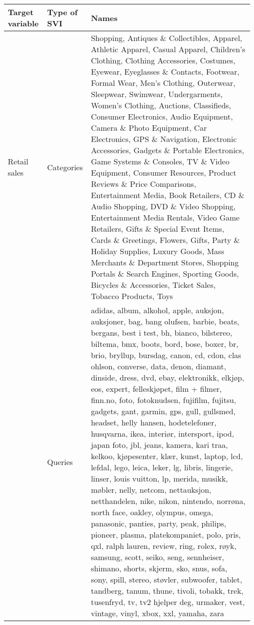 \begin{table}[H]
	\center
	\scriptsize
	\begin{tabularx}{\textwidth}{@{}llX@{}}
		\toprule
 		\textbf{Target variable} & \textbf{Type of SVI} & \textbf{Names} \\ 
  		\midrule
		Retail sales & Categories & Shopping, Antiques \& Collectibles, Apparel, Athletic Apparel, Casual Apparel, Children's Clothing, Clothing Accessories, Costumes, Eyewear, Eyeglasses \& Contacts, Footwear, Formal Wear, Men's Clothing, Outerwear, Sleepwear, Swimwear, Undergarments, Women's Clothing, Auctions, Classifieds, Consumer Electronics, Audio Equipment, Camera \& Photo Equipment, Car Electronics, GPS \& Navigation, Electronic Accessories, Gadgets \& Portable Electronics, Game Systems \& Consoles, TV \& Video Equipment, Consumer Resources, Product Reviews \& Price Comparisons, Entertainment Media, Book Retailers, CD \& Audio Shopping, DVD \& Video Shopping, Entertainment Media Rentals, Video Game Retailers, Gifts \& Special Event Items, Cards \& Greetings, Flowers, Gifts, Party \& Holiday Supplies, Luxury Goods, Mass Merchants \& Department Stores, Shopping Portals \& Search Engines, Sporting Goods, Bicycles \& Accessories, Ticket Sales, Tobacco Products, Toys \\
  		& Queries & adidas, album, alkohol, apple, auksjon, auksjoner, bag, bang olufsen, barbie, beats, bergans, best i test, bh, bianco, bilstereo, biltema, bmx, boots, bord, bose, boxer, br, brio, bryllup, bursdag, canon, cd, cdon, clas ohlson, converse, data, denon, diamant, dinside, dress, dvd, ebay, elektronikk, elkjøp, eos, expert, felleskjøpet, film + filmer, finn.no, foto, fotoknudsen, fujifilm, fujitsu, gadgets, gant, garmin, gps, gull, gullsmed, headset, helly hansen, hodetelefoner, husqvarna, ikea, interiør, intersport, ipod, japan foto, jbl, jeans, kamera, kari traa, kelkoo, kjøpesenter, klær, kunst, laptop, lcd, lefdal, lego, leica, leker, lg, libris, lingerie, linser, louis vuitton, lp, merida, musikk, møbler, nelly, netcom, nettauksjon, netthandelen, nike, nikon, nintendo, norrøna, north face, oakley, olympus, omega, panasonic, panties, party, peak, philips, pioneer, plasma, platekompaniet, polo, pris, qxl, ralph lauren, review, ring, rolex, røyk, samsung, scott, seiko, seng, sennheiser, shimano, shorts, skjerm, sko, snus, sofa, sony, spill, stereo, støvler, subwoofer, tablet, tandberg, tanum, thune, tivoli, tobakk, trek, tusenfryd, tv, tv2 hjelper deg, urmaker, vest, vintage, vinyl, xbox, xxl, yamaha, zara \\

\end{tabularx}
\end{table}
